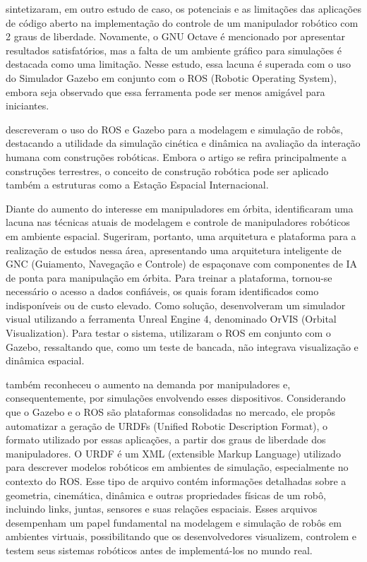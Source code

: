   sintetizaram, em outro estudo de caso, os potenciais e as limitações das aplicações de código aberto na implementação do controle de um manipulador robótico com 2 graus de liberdade. Novamente, o GNU Octave é mencionado por apresentar resultados satisfatórios, mas a falta de um ambiente gráfico para simulações é destacada como uma limitação. Nesse estudo, essa lacuna é superada com o uso do Simulador Gazebo em conjunto com o ROS (Robotic Operating System), embora seja observado que essa ferramenta pode ser menos amigável para iniciantes.

 descreveram o uso do ROS e Gazebo para a modelagem e simulação de robôs, destacando a utilidade da simulação cinética e dinâmica na avaliação da interação humana com construções robóticas. Embora o artigo se refira principalmente a construções terrestres, o conceito de construção robótica pode ser aplicado também a estruturas como a Estação Espacial Internacional.

Diante do aumento do interesse em manipuladores em órbita,  identificaram uma lacuna nas técnicas atuais de modelagem e controle de manipuladores robóticos em ambiente espacial. Sugeriram, portanto, uma arquitetura e plataforma para a realização de estudos nessa área, apresentando uma arquitetura inteligente de GNC (Guiamento, Navegação e Controle) de espaçonave com componentes de IA de ponta para manipulação em órbita. Para treinar a plataforma, tornou-se necessário o acesso a dados confiáveis, os quais foram identificados como indisponíveis ou de custo elevado. Como solução, desenvolveram um simulador visual utilizando a ferramenta Unreal Engine 4, denominado OrVIS (Orbital Visualization). Para testar o sistema, utilizaram o ROS em conjunto com o Gazebo, ressaltando que, como um teste de bancada, não integrava visualização e dinâmica espacial.

 também reconheceu o aumento na demanda por manipuladores e, consequentemente, por simulações envolvendo esses dispositivos. Considerando que o Gazebo e o ROS são plataformas consolidadas no mercado, ele propôs automatizar a geração de URDFs (Unified Robotic Description Format), o formato utilizado por essas aplicações, a partir dos graus de liberdade dos manipuladores. O URDF é um XML (extensible Markup Language) utilizado para descrever modelos robóticos em ambientes de simulação, especialmente no contexto do ROS. Esse tipo de arquivo contém informações detalhadas sobre a geometria, cinemática, dinâmica e outras propriedades físicas de um robô, incluindo links, juntas, sensores e suas relações espaciais. Esses arquivos desempenham um papel fundamental na modelagem e simulação de robôs em ambientes virtuais, possibilitando que os desenvolvedores visualizem, controlem e testem seus sistemas robóticos antes de implementá-los no mundo real.

